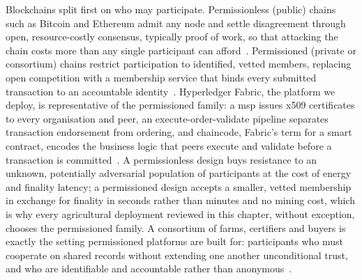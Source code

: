 Blockchains split first on who may participate. Permissionless (public)
chains such as Bitcoin and Ethereum admit any node and settle disagreement
through open, resource-costly consensus, typically proof of work, so that
attacking the chain costs more than any single participant can
afford~\cite{melo2024unlockingblockchain, anon2024securitysecp}.
Permissioned (private or consortium) chains restrict participation to
identified, vetted members, replacing open competition with a membership
service that binds every submitted transaction to an accountable
identity~\cite{jayaram2023hyperledger, krstic2020hyperledgerframeworks}.
Hyperledger Fabric, the platform we deploy, is representative of
the permissioned family: a \gls{msp} issues \gls{x509} certificates to
every organisation and peer, an execute-order-validate pipeline separates
transaction endorsement from ordering, and chaincode, Fabric's term for a
smart contract, encodes the business logic that peers execute and validate
before a transaction is committed~\cite{jayaram2023hyperledger,
mediumChaincode}. A permissionless design buys resistance to an unknown,
potentially adversarial population of participants at the cost of energy
and finality latency; a permissioned design accepts a smaller, vetted
membership in exchange for finality in seconds rather than minutes and no
mining cost, which is why every agricultural deployment reviewed in this
chapter, without exception, chooses the permissioned family. A consortium
of farms, certifiers and buyers is exactly the setting permissioned
platforms are built for: participants who must cooperate on shared records
without extending one another unconditional trust, and who are identifiable
and accountable rather than anonymous~\cite{debruyne2022trust,
kumar2024collaborativenetworks}.

